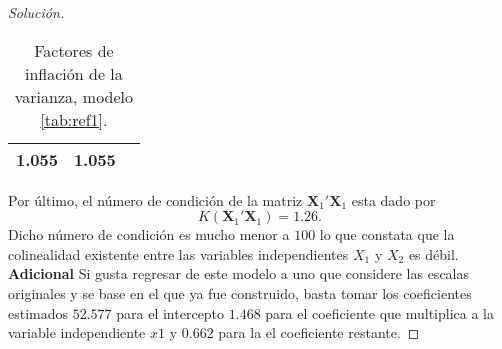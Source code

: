\documentclass[10.5pt,notitlepage]{article}
\newenvironment{solucion}
  {\begin{proof}[Solución]}
  {\end{proof}}
\theoremstyle{plain}
\begin{document}
\begin{solucion}
\begin{table}[H]
\begin{tabular}{@{}l@{\hskip 0.3in}r@{\hskip 0.3in}r@{}}
            \midrule
             1.055 &1.055  \\  
            \bottomrule
        \end{tabular}
        \caption{Factores de inflación de la varianza, modelo \ref{tab:ref1}.}
        \label{tab:ref16}
\end{table}
Por último, el número de condición de la matriz \(\mathbf{X}_{1}'\mathbf{X}_{1}\) esta dado por
\begin{equation}
    K(\mathbf{X}_{1}'\mathbf{X}_{1}) = 1.26.
\end{equation}
Dicho número de condición es mucho menor a \(100\) lo que constata que la colinealidad existente entre las variables independientes \(X_1\) y \(X_2\) es débil.\\

\noindent \textbf{Adicional} Si gusta regresar de este modelo a uno que considere las escalas originales y se base en el que ya fue construido, basta tomar los coeficientes estimados \(52.577\) para el intercepto \(1.468\) para el coeficiente que multiplica a la variable independiente \(x1\) y \(0.662\) para la  el coeficiente restante. 
\end{solucion}
\end{document}
